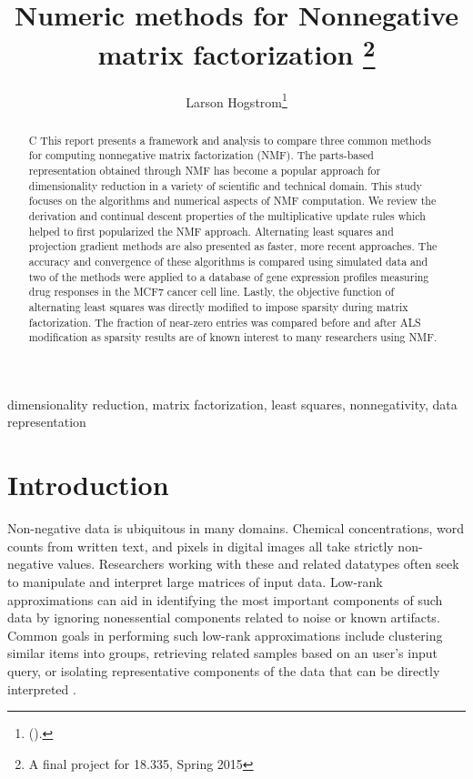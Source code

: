 \documentclass[final,leqno,onefignum,onetabnum]{siamltex1213}
\title{Numeric methods for Nonnegative matrix factorization \thanks{A final project for 18.335, Spring 2015}}
\author{Larson Hogstrom\thanks{
(\email{hogstrom@mit.edu}). }}
\begin{document}
\maketitle
{}%

\begin{abstract}
C This report presents a framework and analysis to compare three common methods for computing nonnegative matrix factorization (NMF). The parts-based representation obtained through NMF has become a popular approach for dimensionality reduction in a variety of scientific and technical domain. This study focuses on the algorithms and numerical aspects of NMF computation. We review the derivation and continual descent properties of the multiplicative update rules which helped to first popularized the NMF approach. Alternating least squares and projection gradient methods are also presented as faster, more recent approaches. The accuracy and convergence of these algorithms is compared using simulated data and two of the methods were applied to a database of gene expression profiles measuring drug responses in the MCF7 cancer cell line. Lastly, the objective function of alternating least squares was directly modified to impose sparsity during matrix factorization. The fraction of near-zero entries was compared before and after ALS modification as sparsity results are of known interest to many researchers using NMF. 
\end{abstract}

\begin{keywords} dimensionality reduction, matrix factorization, least squares, nonnegativity, data representation \end{keywords}



\pagestyle{myheadings}
\thispagestyle{plain}

\section{Introduction}

Non-negative data is ubiquitous in many domains. Chemical concentrations, word counts from written text, and pixels in digital images all take strictly non-negative values. Researchers working with these and related datatypes often seek to manipulate and interpret large matrices of input data. Low-rank approximations can aid in identifying the most important components of such data by ignoring nonessential components related to noise or known artifacts. Common goals in performing such low-rank approximations include clustering similar items into groups, retrieving related samples based on an user's input query, or isolating representative components of the data that can be directly interpreted \cite{Lan}.  
\end{document}
